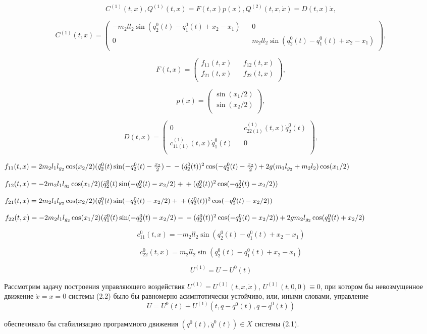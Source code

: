 $$ C^{(1)}(t,x), Q^{(1)}(t,x)=F(t,x)p(x), Q^{(2)}(t,x,\dot x)=D(t,x)\dot x, $$

$$ C^{(1)}(t, x) =
\begin{pmatrix}
- m_2 l l_2 \sin(q_2^0(t) - q_1^0(t) + x_2 - x_1) && 0 \\
0 && m_2 l l_2 \sin(q_2^0(t) - q_1^0(t) + x_2 - x_1) \\
\end{pmatrix}, $$

$$F(t, x) =
\begin{pmatrix}
f_{11}(t,x) && f_{12}(t,x) \\
f_{21}(t,x) && f_{22}(t,x)\\
\end{pmatrix},$$

$$p(x) =
\begin{pmatrix}
\sin(x_1/2) \\
\sin(x_2/2)\\
\end{pmatrix},$$

$$D(t, x) =
\begin{pmatrix}
0 && c_{22(1)}^{(1)}(t,x) \dot q_2^0(t) \\
c_{11(1)}^{(1)}(t,x) \dot q_1^0(t) && 0 \\
\end{pmatrix},$$

$f_{11}(t,x) = 2m_2l_1l_{g_2} \cos(x_2/2) (\ddot q_2^0(t) \sin(- q_2^0(t) - \frac{x_2}{2}) - \\ - (\dot q_2^0(t))^2 \cos(- q_2^0(t) - \frac{x_2}{2}) + 2g(m_1 l_{g_2} + m_2 l_2) \cos(x_1/2)$

$f_{12}(t,x) = - 2 m_2 l_1 l_{g_2} \cos(x_1/2) (\ddot q_2^0(t) \sin(- q_2^0(t) - x_2/2) + \\ + (\dot q_2^0(t))^2 \cos(- q_2^0(t) - x_2/2))$

$f_{21}(t,x) = 2 m_2 l_1 l_{g_2} \cos(x_2/2) (\ddot q_1^0(t) \sin(- q_2^0(t) - x_2/2) + \\ + (\dot q_2^0(t))^2 \cos(- q_2^0(t) - x_2/2))$

$f_{22}(t,x) = - 2m_2 l_1 l_{g_2} \cos(x_1/2) (\ddot q_1^0(t) \sin(- q_2^0(t) - x_2/2) - \\ - (\dot q_2^0(t))^2 \cos(- q_2^0(t) - x_2/2)) + 2 g m_2 l_{g_2} \cos(q_2^0(t) + x_2/2)$

$$ c_11^0(t, x) = - m_2 l l_2 \sin(q_2^0(t) - q_1^0(t) + x_2 - x_1) $$

$$ c_22^0(t, x) = m_2 l l_2 \sin(q_2^0(t) - q_1^0(t) + x_2 - x_1) $$

$$ U^{(1)} = U - U^{0}(t) $$

Рассмотрим задачу построения управляющего воздействия  $ U^{(1)} = U^{(1)}(t, x, \dot x) $, $ U^{(1)} (t, 0, 0) \equiv 0 $, при котором бы невозмущенное движение $\dot x = x = 0$  системы (2.2) было бы равномерно асимптотически устойчиво, или, иными словами, управление $$U = U^0(t) + U^{(1)}(t, q-q^0(t), \dot q - \dot q^0(t))$$

обеспечивало бы стабилизацию программного движения $(q^0(t), \dot q^0(t)) \in X$  системы (2.1).


